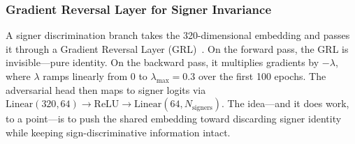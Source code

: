 \documentclass[conference]{IEEEtran}
\begin{document}
\subsubsection{Gradient Reversal Layer for Signer Invariance}
A signer discrimination branch takes the 320-dimensional embedding and passes it through a Gradient Reversal Layer (GRL)~\cite{ganin2016domain}. On the forward pass, the GRL is invisible---pure identity. On the backward pass, it multiplies gradients by $-\lambda$, where $\lambda$ ramps linearly from 0 to $\lambda_{\max} = 0.3$ over the first 100 epochs. The adversarial head then maps to signer logits via $\text{Linear}(320, 64) \rightarrow \text{ReLU} \rightarrow \text{Linear}(64, N_{\text{signers}})$. The idea---and it does work, to a point---is to push the shared embedding toward discarding signer identity while keeping sign-discriminative information intact.
\end{document}
